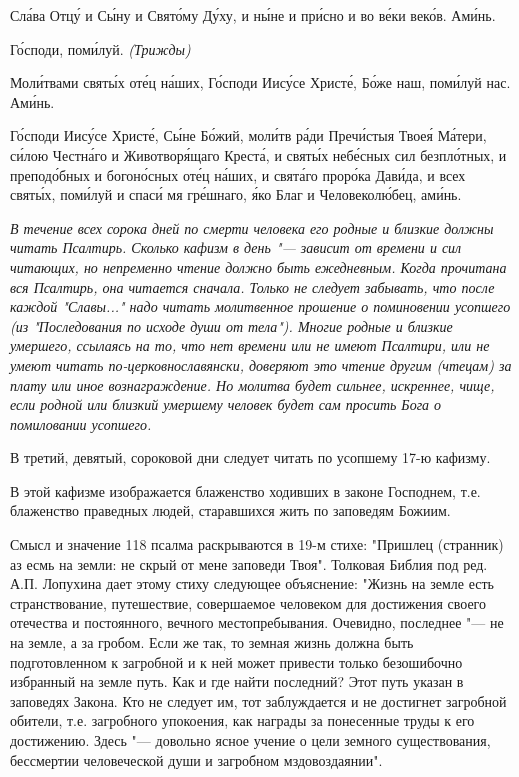    Сла́ва Отцу́ и Сы́ну и Свято́му Ду́ху, и ны́не и при́сно и во ве́ки веко́в.
Ами́нь.


   Го́споди, поми́луй. \itshape (Трижды)\normalfont{}


   Моли́твами святы́х оте́ц на́ших, Го́споди Иису́се Христе́, Бо́же наш,
поми́луй нас. Ами́нь.


   Го́споди Иису́се Христе́, Сы́не Бо́жий, моли́тв ра́ди Пречи́стыя Твоея́
Ма́тери, си́лою Честна́го и Животворя́щаго Креста́, и святы́х небе́сных сил
безпло́тных, и преподо́бных и богоно́сных оте́ц на́ших, и свята́го проро́ка
Дави́да, и всех святы́х, поми́луй и спаси́ мя гре́шнаго, я́ко Благ и
Человеколю́бец, ами́нь.
   


\mychapterending




\itshape В течение всех сорока дней по смерти человека его родные и близкие должны читать Псалтирь. Сколько кафизм в день "--- зависит от времени и сил читающих, но непременно чтение должно быть ежедневным. Когда прочитана вся Псалтирь, она читается сначала. Только не следует забывать, что после каждой "Славы..." надо читать молитвенное прошение о поминовении усопшего (из "Последования по исходе души от тела"). Многие родные и близкие умершего, ссылаясь на то, что нет времени или не имеют Псалтири, или не умеют читать по-церковнославянски, доверяют это чтение другим (чтецам) за плату или иное вознаграждение. Но молитва будет сильнее, искреннее, чище, если родной или близкий умершему человек будет сам просить Бога о помиловании усопшего. 

В третий, девятый, сороковой дни следует читать по усопшему 17-ю кафизму. 

В этой кафизме изображается блаженство ходивших в законе Господнем, т.е. блаженство праведных людей, старавшихся жить по заповедям Божиим. 

Смысл и значение 118 псалма раскрываются в 19-м стихе: "Пришлец (странник) аз есмь на земли: не скрый от мене заповеди Твоя". Толковая Библия под ред. А.П. Лопухина дает этому стиху следующее объяснение: "Жизнь на земле есть странствование, путешествие, совершаемое человеком для достижения своего отечества и постоянного, вечного местопребывания. Очевидно, последнее "--- не на земле, а за гробом. Если же так, то земная жизнь должна быть подготовленном к загробной и к ней может привести только безошибочно избранный на земле путь. Как и где найти последний? Этот путь указан в заповедях Закона. Кто не следует им, тот заблуждается и не достигнет загробной обители, т.е. загробного упокоения, как награды за понесенные труды к его достижению. Здесь "--- довольно ясное учение о цели земного существования, бессмертии человеческой души и загробном мздовоздаянии". 

